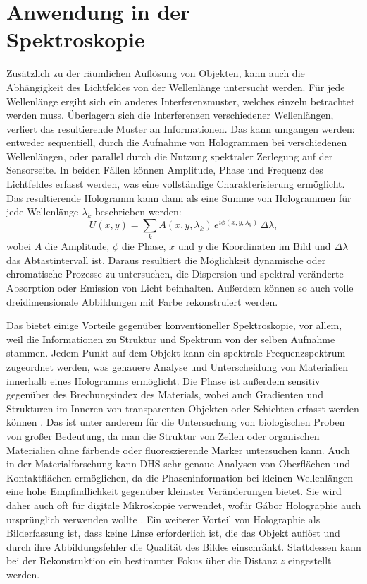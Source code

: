 \documentclass[10pt,twocolumn,a4paper]{article}
\begin{document}
\section{Anwendung in der \\Spektroskopie}
Zusätzlich zu der räumlichen Auflösung von Objekten, kann auch die Abhängigkeit des Lichtfeldes von der Wellenlänge untersucht werden. Für jede Wellenlänge ergibt sich ein anderes Interferenzmuster, welches einzeln betrachtet werden muss. Überlagern sich die Interferenzen verschiedener Wellenlängen, verliert das resultierende Muster an Informationen. Das kann umgangen werden: entweder sequentiell, durch die Aufnahme von Hologrammen bei verschiedenen Wellenlängen, oder parallel durch die Nutzung spektraler Zerlegung auf der Sensorseite. In beiden Fällen können Amplitude, Phase und Frequenz des Lichtfeldes erfasst werden, was eine vollständige Charakterisierung ermöglicht. Das resultierende Hologramm kann dann als eine Summe von Hologrammen für jede Wellenlänge $\lambda_k$ beschrieben werden:
\begin{equation}
    U(x, y) = \sum_k A(x, y, \lambda_k)\, e^{i \phi(x, y, \lambda_k)}\, \Delta\lambda,
\end{equation}
wobei $A$ die Amplitude, $\phi$ die Phase, $x$ und $y$ die Koordinaten im Bild und $\Delta\lambda$ das Abtastintervall ist.
Daraus resultiert die Möglichkeit dynamische oder chromatische Prozesse zu untersuchen, die Dispersion und spektral veränderte Absorption oder Emission von Licht beinhalten. Außerdem können so auch volle dreidimensionale Abbildungen mit Farbe rekonstruiert werden.

Das bietet einige Vorteile gegenüber konventioneller Spektroskopie, vor allem, weil die Informationen zu Struktur und Spektrum von der selben Aufnahme stammen. Jedem Punkt auf dem Objekt kann ein spektrale Frequenzspektrum zugeordnet werden, was genauere Analyse und Unterscheidung von Materialien innerhalb eines Hologramms ermöglicht. Die Phase ist außerdem sensitiv gegenüber des Brechungsindex des Materials, wobei auch Gradienten und Strukturen im Inneren von transparenten Objekten oder Schichten erfasst werden können \cite{industrial}. Das ist unter anderem für die Untersuchung von biologischen Proben von großer Bedeutung, da man die Struktur von Zellen oder organischen Materialien ohne färbende oder fluoreszierende Marker untersuchen kann. Auch in der Materialforschung kann DHS sehr genaue Analysen von Oberflächen und Kontaktflächen ermöglichen, da die Phaseninformation bei kleinen Wellenlängen eine hohe Empfindlichkeit gegenüber kleinster Veränderungen bietet. Sie wird daher auch oft für digitale Mikroskopie verwendet, wofür Gábor Holographie auch ursprünglich verwenden wollte \cite{DHM}. Ein weiterer Vorteil von Holographie als Bilderfassung ist, dass keine Linse erforderlich ist, die das Objekt auflöst und durch ihre Abbildungsfehler die Qualität des Bildes einschränkt. Stattdessen kann bei der Rekonstruktion ein bestimmter Fokus über die Distanz $z$ eingestellt werden.
\end{document}
